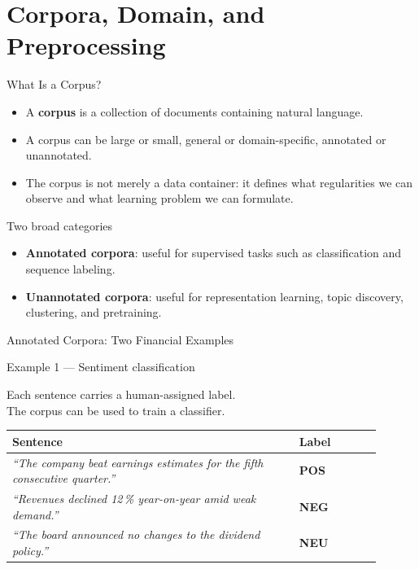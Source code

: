 \documentclass[aspectratio=169]{beamer}
\begin{document}
\section{Corpora, Domain, and Preprocessing}
%
\begin{frame}{What Is a Corpus?}
\begin{itemize}
    \item A \textbf{corpus} is a collection of documents containing natural language.
    \item A corpus can be large or small, general or domain-specific, annotated or unannotated.
    \item The corpus is not merely a data container: it defines what regularities we can observe and what learning problem we can formulate.
\end{itemize}

\vspace{0.15cm}
\begin{block}{Two broad categories}
\begin{itemize}
    \item \textbf{Annotated corpora}: useful for supervised tasks such as classification and sequence labeling.
    \item \textbf{Unannotated corpora}: useful for representation learning, topic discovery, clustering, and pretraining.
\end{itemize}
\end{block}
\end{frame}
%
%
\begin{frame}{Annotated Corpora: Two Financial Examples}
\begin{block}{Example 1 --- Sentiment classification}

\vspace{0.3cm}

Each sentence carries a human-assigned label.\\
The corpus can be used to train a classifier.

\vspace{0.3cm}

\renewcommand{\arraystretch}{1.30}
\begin{tabular}{>{\raggedright\arraybackslash}p{0.70\linewidth}
                >{\centering\arraybackslash}p{0.20\linewidth}}
\toprule
\textbf{Sentence} & \textbf{Label} \\
\midrule
\textit{``The company beat earnings estimates for the fifth consecutive quarter.''} &
\textcolor{Forest}{\textbf{POS}} \\
\textit{``Revenues declined 12\,\% year-on-year amid weak demand.''} &
\textcolor{DeepRed}{\textbf{NEG}} \\
\textit{``The board announced no changes to the dividend policy.''} &
\textcolor{CourseBlue}{\textbf{NEU}} \\
\bottomrule
\end{tabular}
\end{block}
\end{frame}
\end{document}
